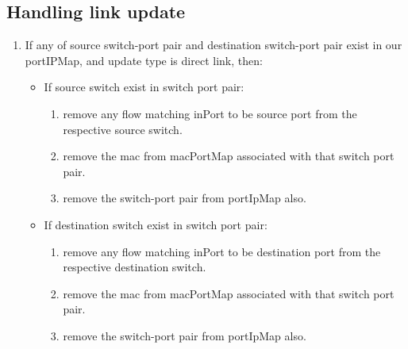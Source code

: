 \documentclass{article}
\begin{document}
\subsection{Handling link update}

\begin{enumerate}
	\item If any of source switch-port pair and destination switch-port pair exist in our portIPMap, and update type is direct link, then:
		\begin{itemize}
			\item If source switch exist in switch port pair:
				\begin{enumerate}
					\item remove any flow matching inPort to be source port from the respective source switch.
					\item remove the mac from macPortMap associated with that switch port pair.
					\item remove the switch-port pair from portIpMap also.
				\end{enumerate}
			\item If destination switch exist in switch port pair:
				\begin{enumerate}
					\item remove any flow matching inPort to be destination port from the respective destination switch.
					\item remove the mac from macPortMap associated with that switch port pair.
					\item remove the switch-port pair from portIpMap also.
				\end{enumerate}
		\end{itemize}
		
		
\end{enumerate}

\printbibliography
\end{document}
